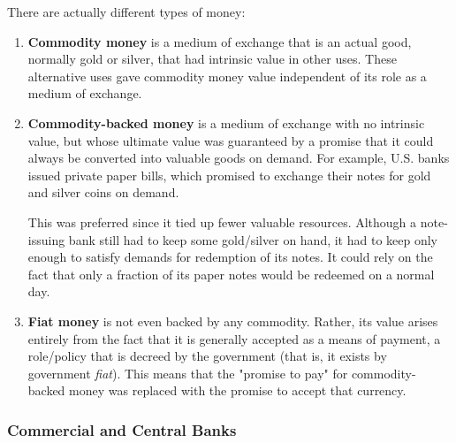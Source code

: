 \documentclass{article}
\begin{document}
      \begin{definition}
        There are actually different types of money: 
        \begin{enumerate}
          \item \textbf{Commodity money} is a medium of exchange that is an actual good, normally gold or silver, that had intrinsic value in other uses. These alternative uses gave commodity money value independent of its role as a medium of exchange. 
          \item \textbf{Commodity-backed money} is a medium of exchange with no intrinsic value, but whose ultimate value was guaranteed by a promise that it could always be converted into valuable goods on demand. For example, U.S. banks issued private paper bills, which promised to exchange their notes for gold and silver coins on demand. 
          
          This was preferred since it tied up fewer valuable resources. Although a note-issuing bank still had to keep some gold/silver on hand, it had to keep only enough to satisfy demands for redemption of its notes. It could rely on the fact that only a fraction of its paper notes would be redeemed on a normal day. 
          \item \textbf{Fiat money} is not even backed by any commodity. Rather, its value arises entirely from the fact that it is generally accepted as a means of payment, a role/policy that is decreed by the government (that is, it exists by government \textit{fiat}). This means that the "promise to pay" for commodity-backed money was replaced with the promise to accept that currency. 
        \end{enumerate}
      \end{definition}

    \subsubsection{Commercial and Central Banks}
\end{document}
